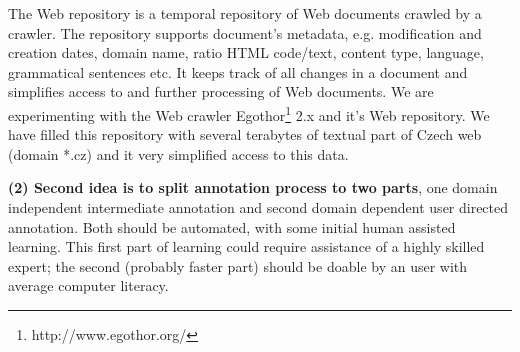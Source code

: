 \documentclass{www2009-submission}
\begin{document}
The Web repository is a temporal repository of Web documents crawled by a crawler. The repository supports document's metadata, e.g. modification and creation dates, domain name, ratio HTML code/text, content type, language, grammatical sentences etc. It keeps track of all changes in a document and simplifies access to and further processing of Web documents. We are experimenting with the Web crawler Egothor\footnote{http://www.egothor.org/} 2.x and it's Web repository. We have filled this repository with several terabytes of textual part of Czech web (domain *.cz) and it very simplified access to this data.





\textbf{(2) Second idea is to split annotation process to two parts}, one domain independent intermediate annotation and second domain dependent user directed annotation. Both should be automated, with some initial human assisted learning. This first part of learning could require assistance of a highly skilled expert; the second (probably faster part) should be doable by an user with average computer literacy. \par


\end{document}
